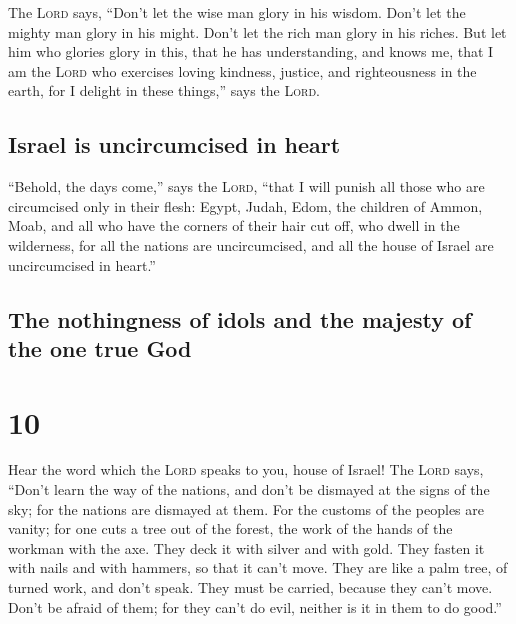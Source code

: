  The \textsc{Lord} says, ``Don't let the wise man glory
in his wisdom. Don't let the mighty man glory in his might. Don't let
the rich man glory in his riches.  But let him who
glories glory in this, that he has understanding, and knows me, that I
am the \textsc{Lord} who exercises loving kindness, justice, and
righteousness in the earth, for I delight in these things,'' says the
\textsc{Lord}.

\hypertarget{israel-is-uncircumcised-in-heart}{%
\subsection{Israel is uncircumcised in
heart}\label{israel-is-uncircumcised-in-heart}}

 ``Behold, the days come,'' says the \textsc{Lord},
``that I will punish all those who are circumcised only in their flesh:
 Egypt, Judah, Edom, the children of Ammon, Moab, and all
who have the corners of their hair cut off, who dwell in the wilderness,
for all the nations are uncircumcised, and all the house of Israel are
uncircumcised in heart.''

\hypertarget{the-nothingness-of-idols-and-the-majesty-of-the-one-true-god}{%
\subsection{The nothingness of idols and the majesty of the one true
God}\label{the-nothingness-of-idols-and-the-majesty-of-the-one-true-god}}

\hypertarget{section-9}{%
\section{10}\label{section-9}}

 Hear the word which the \textsc{Lord} speaks to you,
house of Israel!  The \textsc{Lord} says, ``Don't learn
the way of the nations, and don't be dismayed at the signs of the sky;
for the nations are dismayed at them.  For the customs of
the peoples are vanity; for one cuts a tree out of the forest, the work
of the hands of the workman with the axe.  They deck it
with silver and with gold. They fasten it with nails and with hammers,
so that it can't move.  They are like a palm tree, of
turned work, and don't speak. They must be carried, because they can't
move. Don't be afraid of them; for they can't do evil, neither is it in
them to do good.''

